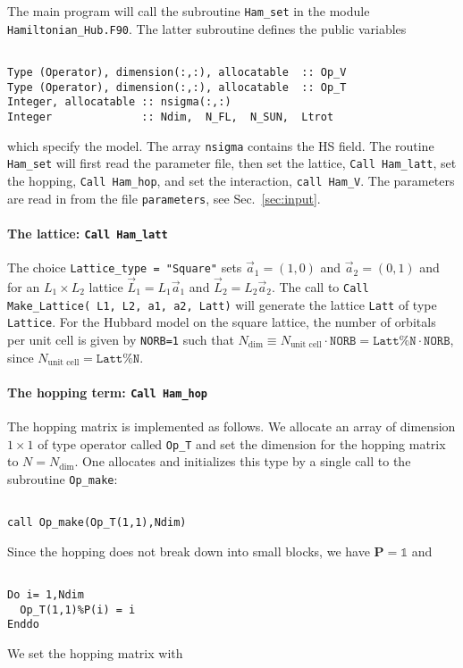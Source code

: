 The main program will call the subroutine   \texttt{Ham\_set} in the module \texttt{Hamiltonian\_Hub.F90}.
The latter  subroutine  defines the  public variables
\lstset{style=fortran}
\begin{lstlisting}

Type (Operator), dimension(:,:), allocatable  :: Op_V 
Type (Operator), dimension(:,:), allocatable  :: Op_T
Integer, allocatable :: nsigma(:,:)
Integer              :: Ndim,  N_FL,  N_SUN,  Ltrot

\end{lstlisting}
which specify the model. The array \texttt{nsigma} contains the HS field. The  routine \texttt{Ham\_set}  will first  read the parameter file,  then set the lattice, \texttt{Call Ham\_latt},  set the hopping, \texttt{Call Ham\_hop},  and set the interaction, 
\texttt{call Ham\_V}.  
The parameters are read in from the file \texttt{parameters}, see Sec.~\ref{sec:input}.

\paragraph{The lattice:   \texttt{Call Ham\_latt} }

The choice \texttt{Lattice\_type = "Square"} sets $\vec{a}_1 =  (1,0) $ and $\vec{a}_2 =  (0,1) $  and for an $L_1 \times L_2$  lattice  $\vec{L}_1 = L_1 \vec{a}_1$ and  $\vec{L}_2 = L_2 \vec{a}_2$.     The call to  \texttt{Call Make\_Lattice( L1, L2, a1,  a2, Latt)} will generate the lattice   \texttt{Latt} of type \texttt{Lattice}. 
For the Hubbard model on the square lattice, the number of orbitals per unit cell is given by \texttt{NORB=1} such that   $N_{\mathrm{dim}}   \equiv N_{\text{unit cell}}   \cdot \texttt{NORB}  = \texttt{Latt\%N} \cdot \texttt{NORB}$, since $N_{\text{unit cell}} = \texttt{Latt\%N}$.

\paragraph{The hopping term: \texttt{Call Ham\_hop}}

The hopping matrix is implemented as follows. 
We allocate an array of dimension $1\times 1$ of type operator  called \texttt{Op\_T} and set the  dimension for the hopping  matrix to $N=N_{\mathrm{dim}}$. One  allocates and initializes this type by a single call to the subroutine \texttt{Op\_make}: 
\begin{lstlisting}

call Op_make(Op_T(1,1),Ndim)

\end{lstlisting}
Since the hopping  does not  break down into small blocks, we have ${\bm P}=\mathds{1}$   and  
\begin{lstlisting}

Do i= 1,Ndim
  Op_T(1,1)%P(i) = i
Enddo

\end{lstlisting}
We set the hopping matrix  with 

